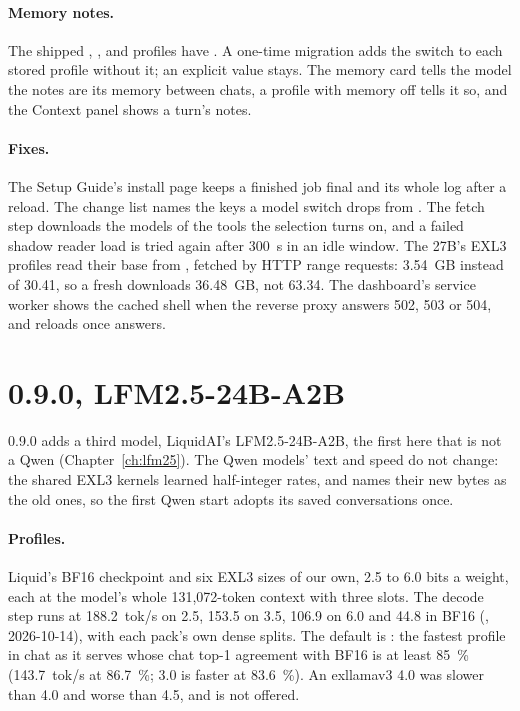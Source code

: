 \paragraph{Memory notes.} The shipped , ,  and  profiles have . A one-time migration adds the switch to each stored profile without it; an explicit value stays. The memory card tells the model the notes are its memory between chats, a profile with memory off tells it so, and the Context panel shows a turn's notes.

\paragraph{Fixes.} The Setup Guide's install page keeps a finished job final and its whole log after a reload. The change list names the keys a model switch drops from . The fetch step downloads the models of the tools the selection turns on, and a failed shadow reader load is tried again after 300~s in an idle window. The 27B's EXL3 profiles read their base from , fetched by HTTP range requests: 3.54~GB instead of 30.41, so a fresh  downloads 36.48~GB, not 63.34. The dashboard's service worker shows the cached shell when the reverse proxy answers 502, 503 or 504, and reloads once  answers.

\section{0.9.0, LFM2.5-24B-A2B}\label{sec:changelog-090}

0.9.0 adds a third model, LiquidAI's LFM2.5-24B-A2B, the first here that is not a Qwen (Chapter~\ref{ch:lfm25}). The Qwen models' text and speed do not change: the shared EXL3 kernels learned half-integer rates, and  names their new bytes as the old ones, so the first Qwen start adopts its saved conversations once.

\paragraph{Profiles.} Liquid's BF16 checkpoint and six EXL3 sizes of our own, 2.5 to 6.0 bits a weight, each at the model's whole 131,072-token context with three slots. The decode step runs at 188.2~tok/s on 2.5, 153.5 on 3.5, 106.9 on 6.0 and 44.8 in BF16 (\measured, 2026-10-14), with each pack's own dense splits. The default is : the fastest profile in chat as it serves whose chat top-1 agreement with BF16 is at least 85~\% (143.7~tok/s at 86.7~\%; 3.0 is faster at 83.6~\%). An exllamav3  4.0 was slower than 4.0 and worse than 4.5, and is not offered.

